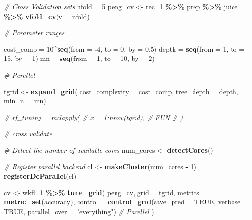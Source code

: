\documentclass[
]{article}
\newenvironment{Shaded}{\begin{snugshade}}{\end{snugshade}}
\newcommand{\AttributeTok}[1]{\textcolor[rgb]{0.13,0.29,0.53}{#1}}
\newcommand{\CommentTok}[1]{\textcolor[rgb]{0.56,0.35,0.01}{\textit{#1}}}
\newcommand{\ConstantTok}[1]{\textcolor[rgb]{0.56,0.35,0.01}{#1}}
\newcommand{\DecValTok}[1]{\textcolor[rgb]{0.00,0.00,0.81}{#1}}
\newcommand{\FloatTok}[1]{\textcolor[rgb]{0.00,0.00,0.81}{#1}}
\newcommand{\FunctionTok}[1]{\textcolor[rgb]{0.13,0.29,0.53}{\textbf{#1}}}
\newcommand{\NormalTok}[1]{#1}
\newcommand{\OtherTok}[1]{\textcolor[rgb]{0.56,0.35,0.01}{#1}}
\newcommand{\SpecialCharTok}[1]{\textcolor[rgb]{0.81,0.36,0.00}{\textbf{#1}}}
\newcommand{\StringTok}[1]{\textcolor[rgb]{0.31,0.60,0.02}{#1}}
\begin{document}
\begin{Shaded}
\begin{Highlighting}[]
\CommentTok{\# Cross Validation sets}
\NormalTok{nfold }\OtherTok{=} \DecValTok{5}
\NormalTok{peng\_cv }\OtherTok{\textless{}{-}}\NormalTok{ rec\_1 }\SpecialCharTok{\%\textgreater{}\%}\NormalTok{ prep }\SpecialCharTok{\%\textgreater{}\%}\NormalTok{ juice }\SpecialCharTok{\%\textgreater{}\%} \FunctionTok{vfold\_cv}\NormalTok{(}\AttributeTok{v =}\NormalTok{ nfold)}

\CommentTok{\# Parameter ranges}

\NormalTok{cost\_comp }\OtherTok{=} \DecValTok{10}\SpecialCharTok{\^{}}\FunctionTok{seq}\NormalTok{(}\AttributeTok{from =} \SpecialCharTok{{-}}\DecValTok{4}\NormalTok{, }\AttributeTok{to =} \DecValTok{0}\NormalTok{, }\AttributeTok{by =} \FloatTok{0.5}\NormalTok{)}
\NormalTok{depth }\OtherTok{=} \FunctionTok{seq}\NormalTok{(}\AttributeTok{from =} \DecValTok{1}\NormalTok{, }\AttributeTok{to =} \DecValTok{15}\NormalTok{, }\AttributeTok{by =} \DecValTok{1}\NormalTok{)}
\NormalTok{mn }\OtherTok{=} \FunctionTok{seq}\NormalTok{(}\AttributeTok{from =} \DecValTok{1}\NormalTok{, }\AttributeTok{to =} \DecValTok{10}\NormalTok{, }\AttributeTok{by =} \DecValTok{2}\NormalTok{)}

\CommentTok{\# Parellel}

\NormalTok{tgrid }\OtherTok{\textless{}{-}} \FunctionTok{expand\_grid}\NormalTok{(}
      \AttributeTok{cost\_complexity =}\NormalTok{ cost\_comp,}
      \AttributeTok{tree\_depth =}\NormalTok{ depth,}
      \AttributeTok{min\_n =}\NormalTok{ mn)}

\CommentTok{\# rf\_tuning = mclapply(}
\CommentTok{\#   x = 1:nrow(tgrid),}
\CommentTok{\#   FUN }
\CommentTok{\# )}

\CommentTok{\# cross validate}

\CommentTok{\# Detect the number of available cores}
\NormalTok{num\_cores }\OtherTok{\textless{}{-}} \FunctionTok{detectCores}\NormalTok{()}

\CommentTok{\# Register parallel backend}
\NormalTok{cl }\OtherTok{\textless{}{-}} \FunctionTok{makeCluster}\NormalTok{(num\_cores }\SpecialCharTok{{-}} \DecValTok{1}\NormalTok{)}
\FunctionTok{registerDoParallel}\NormalTok{(cl)}

\NormalTok{cv }\OtherTok{\textless{}{-}}\NormalTok{ wkfl\_1 }\SpecialCharTok{\%\textgreater{}\%} 
  \FunctionTok{tune\_grid}\NormalTok{(}
\NormalTok{    peng\_cv,}
    \AttributeTok{grid =}\NormalTok{ tgrid,}
    \AttributeTok{metrics =} \FunctionTok{metric\_set}\NormalTok{(accuracy),}
    \AttributeTok{control =} \FunctionTok{control\_grid}\NormalTok{(}\AttributeTok{save\_pred =} \ConstantTok{TRUE}\NormalTok{, }\AttributeTok{verbose =} \ConstantTok{TRUE}\NormalTok{, }\AttributeTok{parallel\_over =} \StringTok{"everything"}\NormalTok{) }\CommentTok{\# Parellel}
\NormalTok{  )}


\end{Highlighting}
\end{Shaded}
\end{document}
